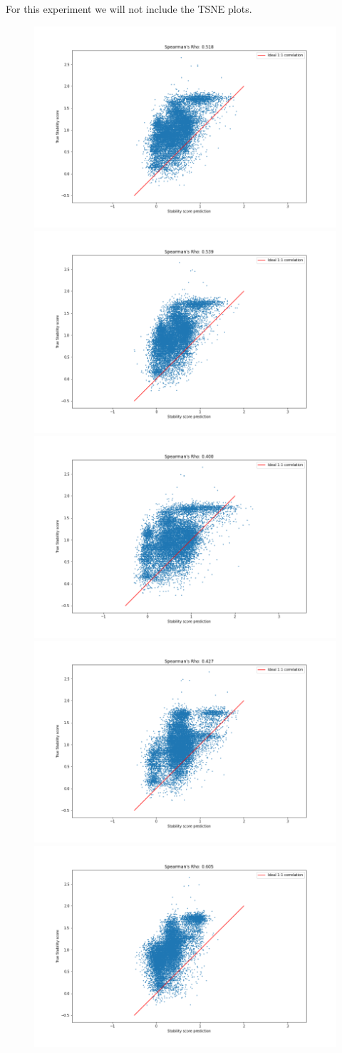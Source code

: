 For this experiment we will not include the TSNE plots.
\begin{figure}[!ht]
  \centering
  \includegraphics[width=0.49\linewidth]{latex/imgs/spearman_2_layer_05_drop_final.png}
  \includegraphics[width=0.49\linewidth]{latex/imgs/spearman_2_layer_05_drop_minloss.png}
  \includegraphics[width=0.49\linewidth]{latex/imgs/spearman_2_layer_no_drop_final.png}
  \includegraphics[width=0.49\linewidth]{latex/imgs/spearman_2_layer_no_drop_minloss.png}
  \includegraphics[width=0.49\linewidth]{latex/imgs/spearman_1_layer_no_schedule_512_final.png}

\end{figure}
